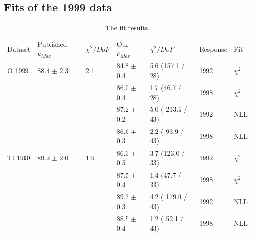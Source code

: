 \subsection { Fits of the 1999 data }

\begin{table}[h]
  \begin{center}
    \begin{tabular}{|l||l|l|l|l|l|l|}
      \hline
      Dataset & Published $k_{Max}$ & $\chi^2 / DoF$ & Our $k_{Max}$ & $\chi^2 / DoF$  & Response & Fit \\
      \hhline{|=||=|=|=|=|=|=|}
       O 1999    & 88.4 $\pm$ 2.3 & 2.1 & 84.8 $\pm$ 0.4 &  5.6 (157.1 / 28)& 1992 & $\chi^2$ \\  
                 &                &     & 86.0 $\pm$ 0.4 &  1.7 (46.7 / 28) & 1998 & $\chi^2$ \\  
                                                                             
                 &                &     & 87.2 $\pm$ 0.2 & 5.0 ( 213.4 / 43)& 1992 & NLL\\
                 &                &     & 86.6 $\pm$ 0.3 & 2.2 ( 93.9 / 43) & 1998 & NLL\\
      \hline                                                                 
       Ti 1999   & 89.2 $\pm$ 2.0 & 1.9 & 86.3 $\pm$ 0.5 &  3.7 (123.0 / 33)& 1992 & $\chi^2$ \\  
                 &                &     & 87.5 $\pm$ 0.4 &  1.4 (47.7 / 33) & 1998 & $\chi^2$ \\  
                                                                             
                 &                &     & 89.3 $\pm$ 0.3 & 4.2 ( 179.0 / 43) & 1992 & NLL \\
                 &                &     & 88.5 $\pm$ 0.4 & 1.2 ( 52.1 / 43) & 1998 & NLL \\
      \hline                           
    \end{tabular}
  \end{center}
  \caption{The fit results.}
  \label{table:fits1999}
\end{table}
